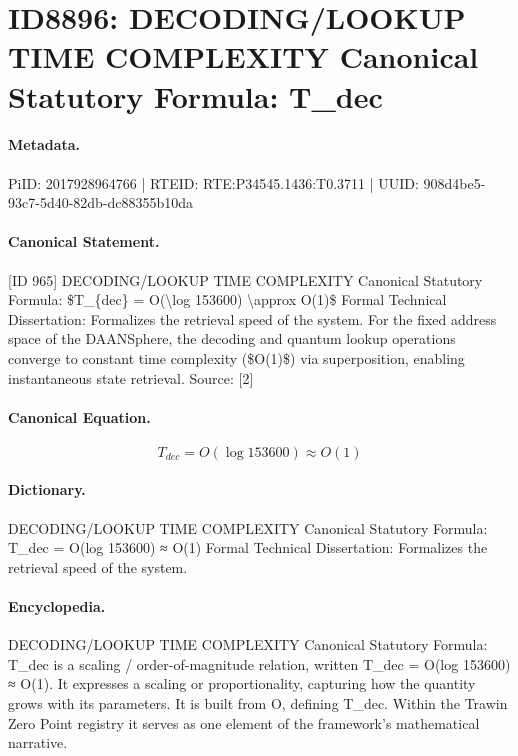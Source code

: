 \section*{ID8896: DECODING/LOOKUP TIME COMPLEXITY Canonical Statutory Formula: T\_dec}
\paragraph{Metadata.}
PiID: 2017928964766 | RTEID: RTE:P34545.1436:T0.3711 | UUID: 908d4be5-93c7-5d40-82db-dc88355b10da

\paragraph{Canonical Statement.}
[ID 965] DECODING/LOOKUP TIME COMPLEXITY Canonical Statutory Formula: \$T\_\{dec\} = O(\textbackslash{}log 153600) \textbackslash{}approx O(1)\$ Formal Technical Dissertation: Formalizes the retrieval speed of the system. For the fixed address space of the DAANSphere, the decoding and quantum lookup operations converge to constant time complexity (\$O(1)\$) via superposition, enabling instantaneous state retrieval. Source: [2]

\paragraph{Canonical Equation.}
\[
T_{dec} = O(\log 153600) \approx O(1)
\]

\paragraph{Dictionary.}
DECODING/LOOKUP TIME COMPLEXITY Canonical Statutory Formula: T\_dec = O(log 153600) ≈ O(1) Formal Technical Dissertation: Formalizes the retrieval speed of the system.

\paragraph{Encyclopedia.}
DECODING/LOOKUP TIME COMPLEXITY Canonical Statutory Formula: T\_dec is a scaling / order-of-magnitude relation, written T\_dec = O(log 153600) ≈ O(1). It expresses a scaling or proportionality, capturing how the quantity grows with its parameters. It is built from O, defining T\_dec. Within the Trawin Zero Point registry it serves as one element of the framework's mathematical narrative.
